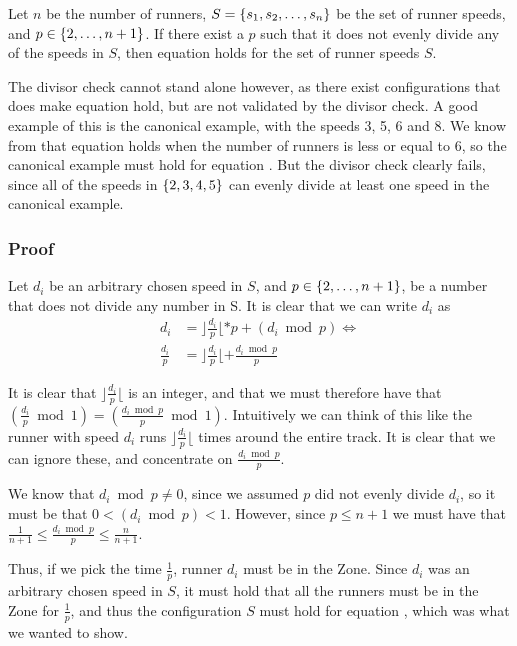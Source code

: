 Let $n$ be the number of runners, $S = \{s_1, s_2, \ldots, s_n\}$ be the set of runner speeds, and $p \in \{2, \ldots, n+1\}$. If there exist a $p$ such that it does not evenly divide any of the speeds in $S$, then equation  holds for the set of runner speeds $S$. 

The divisor check cannot stand alone however, as there exist configurations that does make equation  hold, but are not validated by the divisor check. A good example of this is the canonical example, with the speeds 3, 5, 6 and 8. We know from \cite{serra_thelonely} that equation  holds when the number of runners is less or equal to 6, so the canonical example must hold for equation . But the divisor check clearly fails, since all of the speeds in $\{2, 3, 4, 5\}$ can evenly divide at least one speed in the canonical example.


\subsubsection{Proof}
Let $d_i$ be an arbitrary chosen speed in $S$, and $p \in \{2, \ldots, n+1\}$, be a number that does not divide any number in S. It is clear that we can write $d_i$ as
\begin{equation}
\begin{split}
d_i &= \rfloor\frac{d_i}{p}\lfloor * p + (d_i \bmod p) \Leftrightarrow\\
\frac{d_i}{p} &= \rfloor\frac{d_i}{p}\lfloor + \frac{d_i \bmod p}{p}
\end{split}
\end{equation}

It is clear that $\rfloor\frac{d_i}{p}\lfloor$ is an integer, and that we must therefore have that $(\frac{d_i}{p} \bmod 1) = (\frac{d_i \bmod p}{p} \bmod 1)$. Intuitively we can think of this like the runner with speed $d_i$ runs $\rfloor \frac{d_i}{p}\lfloor$ times around the entire track. It is clear that we can ignore these, and concentrate on $\frac{d_i \bmod p}{p}$. 

We know that $d_i \bmod p \neq 0$, since we assumed $p$ did not evenly divide $d_i$, so it must be that $0 < (d_i \bmod p) < 1$. However, since $p \leq n+1$ we must have that $\frac{1}{n+1} \leq \frac{d_i \bmod p}{p} \leq \frac{n}{n+1}$.

Thus, if we pick the time $\frac{1}{p}$, runner $d_i$ must be in the Zone. Since $d_i$ was an arbitrary chosen speed in $S$, it must hold that all the runners must be in the Zone for $\frac{1}{p}$, and thus the configuration $S$ must hold for equation , which was what we wanted to show.


